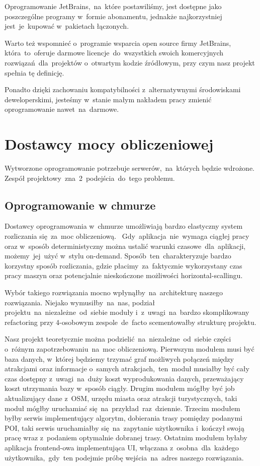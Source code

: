 Oprogramowanie JetBrains,~na~które postawiliśmy, jest dostępne jako poszczególne programy w~formie abonamentu, jednakże najkorzystniej jest~je~kupować w~pakietach łączonych.

Warto też wspomnieć o~programie wsparcia open source firmy JetBrains, która~to~oferuje darmowe licencje~do~wszystkich swoich komercyjnych rozwiązań~dla~projektów o~otwartym kodzie źródłowym, przy czym nasz projekt spełnia tę definicję.

Ponadto dzięki zachowaniu kompatybilności z~alternatywnymi środowiskami deweloperskimi, jesteśmy w~stanie małym nakładem pracy zmienić oprogramowanie nawet~na~darmowe.

\section{Dostawcy mocy obliczeniowej}
\label{sec:dostawcy-mocy-obliczeniowej}
Wytworzone oprogramowanie potrzebuje serwerów,~na~których będzie wdrożone.
Zespół projektowy~zna~2~podejścia~do~tego problemu.

\subsection{Oprogramowanie w chmurze}\label{subsec:oprogramowanie-w-chmurze}
Dostawcy oprogramowania w~chmurze umożliwiają bardzo elastyczny system rozliczania się~za~moc obliczeniową.
~Gdy~aplikacja~nie~wymaga ciągłej pracy oraz w~sposób deterministyczny można ustalić warunki czasowe~dla~aplikacji, możemy~jej~użyć w~stylu \gls{on-demand}.
Sposób~ten~charakteryzuje bardzo korzystny sposób rozliczania, gdzie płacimy~za~faktycznie wykorzystany czas pracy maszyn oraz potencjalnie nieskończone możliwości horizontal-scallingu.

Wybór takiego rozwiązania mocno wpłynąłby~na~architekturę naszego rozwiązania.
Niejako wymusiłby~na~nas, podział projektu~na~niezależne~od~siebie moduły i~z~uwagi~na~bardzo skomplikowany \gls{refactoring} przy 4-osobowym zespole~de~facto scementowałby strukturę projektu.

Nasz projekt teoretycznie można podzielić~na~niezależne~od~siebie części o~różnym zapotrzebowaniu~na~moc obliczeniową.
Pierwszym modułem musi być baza danych, w~której będziemy trzymać graf możliwych połączeń między atrakcjami oraz informacje o~samych atrakcjach,~ten~moduł musiałby być cały czas dostępny z~uwagi~na~duży koszt wyprodukowania danych, przeważający koszt utrzymania bazy w~sposób ciągły.
Drugim modułem mógłby być \gls{job} aktualizujący dane z~OSM, urzędu miasta oraz atrakcji turystycznych, taki moduł mógłby uruchamiać się~na~przykład~raz~dziennie.
Trzecim modułem byłby serwis implementujący algorytm, dobierania trasy pomiędzy podanymi POI, taki serwis uruchamiałby się~na~zapytanie użytkownika i~kończył swoją pracę wraz z~podaniem optymalnie dobranej trasy.
Ostatnim modułem byłaby aplikacja \gls{frontend}-owa implementująca UI, włączana z~osobna~dla~każdego użytkownika,~gdy~ten podejmie próbę wejścia~na~adres naszego rozwiązania.

